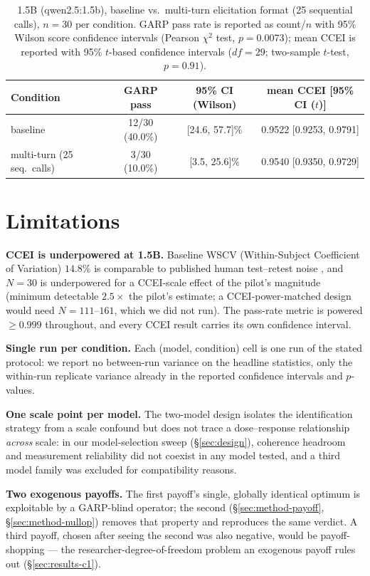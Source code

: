\documentclass{article}
\begin{document}
\begin{table}[h]
\centering
\footnotesize
\caption{1.5B (qwen2.5:1.5b), baseline vs.\ multi-turn elicitation format (25 sequential calls),
$n=30$ per condition. GARP pass rate is reported as count/$n$ with 95\% Wilson score confidence
intervals (Pearson $\chi^2$ test, $p=0.0073$); mean CCEI is reported with 95\% $t$-based
confidence intervals ($df=29$; two-sample $t$-test, $p=0.91$).}
\label{tab:multiturn}
\begin{tabular}{lccc}
\toprule
Condition & GARP pass & 95\% CI (Wilson) & mean CCEI [95\% CI ($t$)] \\
\midrule
baseline                    & 12/30 (40.0\%) & [24.6, 57.7]\% & 0.9522 [0.9253, 0.9791] \\
multi-turn (25 seq.\ calls) & 3/30 (10.0\%)  & [3.5, 25.6]\%  & 0.9540 [0.9350, 0.9729] \\
\bottomrule
\end{tabular}
\end{table}

\section{Limitations}
\label{sec:limitations}

\textbf{CCEI is underpowered at 1.5B.} Baseline WSCV (Within-Subject Coefficient of Variation)
$14.8\%$ is comparable to published human test--retest noise \citep{nitsch2022reliability}, and
$N=30$ is underpowered for a CCEI-scale effect of the pilot's magnitude (minimum detectable
$2.5\times$ the pilot's estimate; a CCEI-power-matched design would need $N=111$--$161$, which we
did not run). The pass-rate metric is powered $\ge0.999$ throughout, and every CCEI result
carries its own confidence interval.

\textbf{Single run per condition.} Each (model, condition) cell is one run of the stated
protocol: we report no between-run variance on the headline statistics, only the within-run
replicate variance already in the reported confidence intervals and $p$-values.

\textbf{One scale point per model.} The two-model design isolates the identification strategy
from a scale confound but does not trace a dose--response relationship \emph{across} scale: in
our model-selection sweep (\S\ref{sec:design}), coherence headroom and measurement reliability
did not coexist in any model tested, and a third model family was excluded for compatibility
reasons.

\textbf{Two exogenous payoffs.} The first payoff's single, globally identical optimum is
exploitable by a GARP-blind operator; the second (\S\ref{sec:method-payoff},
\S\ref{sec:method-nullop}) removes that property and reproduces the same verdict. A third
payoff, chosen after seeing the second was also negative, would be payoff-shopping --- the
researcher-degree-of-freedom problem an exogenous payoff rules out (\S\ref{sec:results-c1}).
\end{document}
